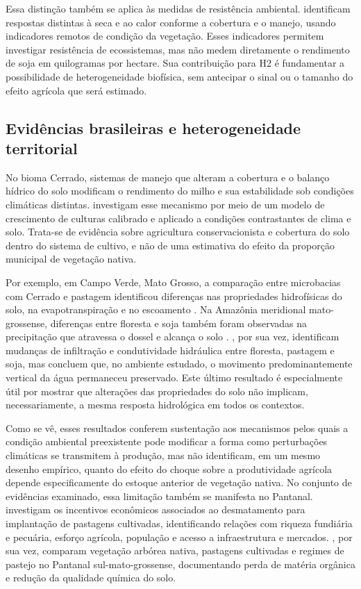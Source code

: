 Essa distinção também se aplica às medidas de resistência ambiental.  identificam respostas distintas à seca e ao calor conforme a cobertura e o manejo, usando indicadores remotos de condição da vegetação. Esses indicadores permitem investigar resistência de ecossistemas, mas não medem diretamente o rendimento de soja em quilogramas por hectare. Sua contribuição para H2 é fundamentar a possibilidade de heterogeneidade biofísica, sem antecipar o sinal ou o tamanho do efeito agrícola que será estimado.

\subsection{Evidências brasileiras e heterogeneidade territorial}

No bioma Cerrado, sistemas de manejo que alteram a cobertura e o balanço hídrico do solo modificam o rendimento do milho e sua estabilidade sob condições climáticas distintas.  investigam esse mecanismo por meio de um modelo de crescimento de culturas calibrado e aplicado a condições contrastantes de clima e solo. Trata-se de evidência sobre agricultura conservacionista e cobertura do solo dentro do sistema de cultivo, e não de uma estimativa do efeito da proporção municipal de vegetação nativa.

Por exemplo, em Campo Verde, Mato Grosso, a comparação entre microbacias com Cerrado e pastagem identificou diferenças nas propriedades hidrofísicas do solo, na evapotranspiração e no escoamento \cite{NobregaEtAl2017}. Na Amazônia meridional mato-grossense, diferenças entre floresta e soja também foram observadas na precipitação que atravessa o dossel e alcança o solo \cite{BaseEtAl2012}. , por sua vez, identificam mudanças de infiltração e condutividade hidráulica entre floresta, pastagem e soja, mas concluem que, no ambiente estudado, o movimento predominantemente vertical da água permaneceu preservado. Este último resultado é especialmente útil por mostrar que alterações das propriedades do solo não implicam, necessariamente, a mesma resposta hidrológica em todos os contextos.

Como se vê, esses resultados conferem sustentação aos mecanismos pelos quais a condição ambiental preexistente pode modificar a forma como perturbações climáticas se transmitem à produção, mas não identificam, em um mesmo desenho empírico, quanto do efeito do choque sobre a produtividade agrícola depende especificamente do estoque anterior de vegetação nativa. No conjunto de evidências examinado, essa limitação também se manifesta no Pantanal.  investigam os incentivos econômicos associados ao desmatamento para implantação de pastagens cultivadas, identificando relações com riqueza fundiária e pecuária, esforço agrícola, população e acesso a infraestrutura e mercados. , por sua vez, comparam vegetação arbórea nativa, pastagens cultivadas e regimes de pastejo no Pantanal sul-mato-grossense, documentando perda de matéria orgânica e redução da qualidade química do solo.

